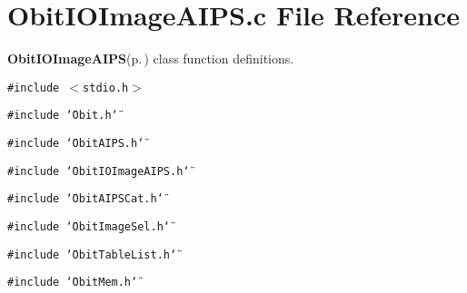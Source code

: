 \section{Obit\-IOImage\-AIPS.c File Reference}
\label{ObitIOImageAIPS_8c}
{\bf Obit\-IOImage\-AIPS}{\rm (p.\,\pageref{structObitIOImageAIPS})} class function definitions. 

{\tt \#include $<$stdio.h$>$}\par
{\tt \#include \char`\"{}Obit.h\char`\"{}}\par
{\tt \#include \char`\"{}Obit\-AIPS.h\char`\"{}}\par
{\tt \#include \char`\"{}Obit\-IOImage\-AIPS.h\char`\"{}}\par
{\tt \#include \char`\"{}Obit\-AIPSCat.h\char`\"{}}\par
{\tt \#include \char`\"{}Obit\-Image\-Sel.h\char`\"{}}\par
{\tt \#include \char`\"{}Obit\-Table\-List.h\char`\"{}}\par
{\tt \#include \char`\"{}Obit\-Mem.h\char`\"{}}\par
